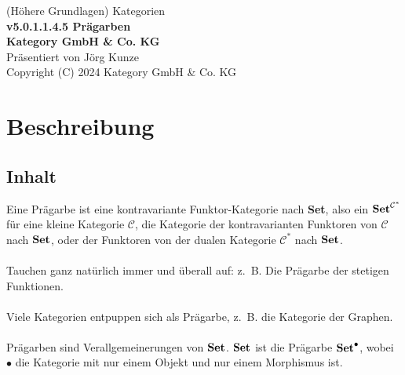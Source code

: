 \documentclass[a4paper]{amsart}
\theoremstyle{definition}
\newcommand{\CC}{\ensuremath{\mathcal{ C }}}
\newcommand{\Set}{\text{\textbf{Set}}}
\newcommand{\zb}{z.~B. }
\begin{document}
\begin{titlepage}
\centering
{\huge
(Höhere Grundlagen) Kategorien\\[1cm]
\textbf{v5.0.1.1.4.5 Prägarben}
}\\[1cm]

\textbf{Kategory GmbH \& Co. KG}\\
Präsentiert von Jörg Kunze\\
Copyright (C) 2024 Kategory GmbH \& Co. KG

\end{titlepage}

%

\newpage

\section*{Beschreibung}

\subsection*{Inhalt}
Eine Prägarbe ist eine kontravariante Funktor-Kategorie nach \textbf{Set}, also ein $\Set^{\CC^*}$ für eine kleine Kategorie $\CC$, die Kategorie der kontravarianten Funktoren von $\CC$ nach $\Set$, oder der Funktoren von der dualen Kategorie $\CC^*$ nach $\Set$.
\\\\
Tauchen ganz natürlich immer und überall auf: \zb Die Prägarbe der stetigen Funktionen.
\\\\
Viele Kategorien entpuppen sich als Prägarbe, \zb die Kategorie der Graphen.
\\\\
Prägarben sind Verallgemeinerungen von $\Set$. $\Set$ ist die Prägarbe $\Set^\bullet$, wobei $\bullet$ die Kategorie mit nur einem Objekt und nur einem Morphismus ist.
\end{document}
